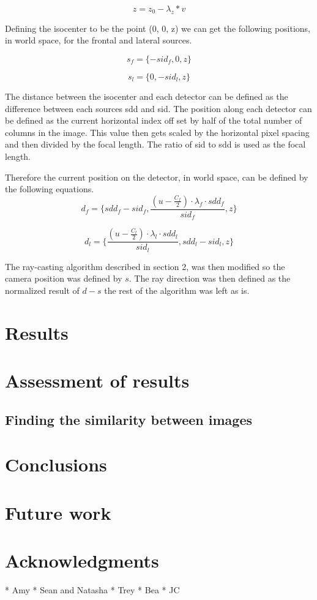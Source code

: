 \documentclass[11pt,twocolumn]{article}
\begin{document}
\begin{equation}
  z = z_0 - \lambda_z * v
\end{equation}

Defining the isocenter to be the point (0, 0, z) we can get the following positions, in world space, for the frontal 
and lateral sources.

\begin{equation}
  s_f = \{-sid_f,0,z\}
\end{equation}

\begin{equation}
  s_l = \{0,-sid_l,z\}
\end{equation}

The distance between the isocenter and each detector can be defined as the difference between each sources sdd and sid.
The position along each detector can be defined as the current horizontal index off set by half of the total number 
of columns in the image. This value then gets scaled by the horizontal pixel spacing and then divided by the focal
length. The ratio of sid to sdd is used as the focal length.

Therefore the current position on the detector, in world space, can be defined by the following equations.
\begin{equation}
  d_f = \{sdd_f-sid_f, \frac{(u - \frac{C_f}{2}) \cdot \lambda_f \cdot sdd_f}{sid_f},z\}
\end{equation}

\begin{equation}
  d_l = \{\frac{(u - \frac{C_l}{2}) \cdot \lambda_l \cdot sdd_l}{sid_l}, sdd_l-sid_l, z\}
\end{equation}

The ray-casting algorithm described in section 2, was then modified so the camera position was defined by $s$. The ray direction was then defined as the normalized result of $d-s$ the rest of the
algorithm was left as is.

\section{Results}

\section{Assessment of results}
\subsection{Finding the similarity between images}


\section{Conclusions}

\section{Future work}

\section{Acknowledgments}

* Amy
* Sean and Natasha
* Trey
* Bea
* JC




\end{document}

